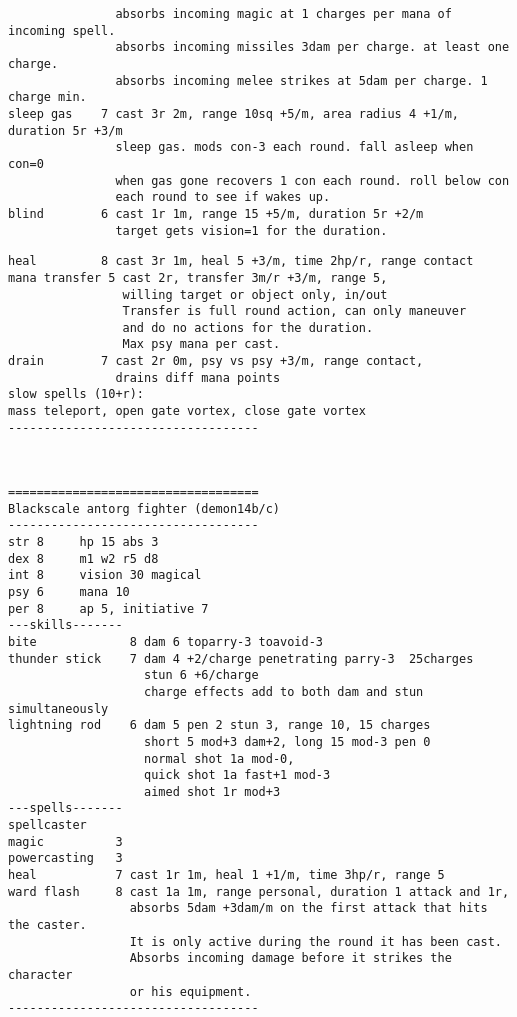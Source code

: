 \begin{samepage}
\begin{verbatim}
               absorbs incoming magic at 1 charges per mana of incoming spell.
               absorbs incoming missiles 3dam per charge. at least one charge.
               absorbs incoming melee strikes at 5dam per charge. 1 charge min.
sleep gas    7 cast 3r 2m, range 10sq +5/m, area radius 4 +1/m, duration 5r +3/m
               sleep gas. mods con-3 each round. fall asleep when con=0
               when gas gone recovers 1 con each round. roll below con
               each round to see if wakes up.
blind        6 cast 1r 1m, range 15 +5/m, duration 5r +2/m
               target gets vision=1 for the duration.
\end{verbatim} \end{samepage} \goodbreak \begin{samepage} \begin{verbatim}
heal         8 cast 3r 1m, heal 5 +3/m, time 2hp/r, range contact
mana transfer 5 cast 2r, transfer 3m/r +3/m, range 5,
                willing target or object only, in/out
                Transfer is full round action, can only maneuver
                and do no actions for the duration.
                Max psy mana per cast.
drain        7 cast 2r 0m, psy vs psy +3/m, range contact,
               drains diff mana points
slow spells (10+r):
mass teleport, open gate vortex, close gate vortex
-----------------------------------
\end{verbatim} \normalsize \end{samepage}

\

\goodbreak \begin{samepage} \small \begin{verbatim}
===================================
Blackscale antorg fighter (demon14b/c)
-----------------------------------
str 8     hp 15 abs 3
dex 8     m1 w2 r5 d8
int 8     vision 30 magical
psy 6     mana 10
per 8     ap 5, initiative 7
---skills-------
bite             8 dam 6 toparry-3 toavoid-3
thunder stick    7 dam 4 +2/charge penetrating parry-3  25charges
                   stun 6 +6/charge
                   charge effects add to both dam and stun simultaneously
lightning rod    6 dam 5 pen 2 stun 3, range 10, 15 charges
                   short 5 mod+3 dam+2, long 15 mod-3 pen 0
                   normal shot 1a mod-0,
                   quick shot 1a fast+1 mod-3
                   aimed shot 1r mod+3
---spells-------
spellcaster
magic          3
powercasting   3
heal           7 cast 1r 1m, heal 1 +1/m, time 3hp/r, range 5
ward flash     8 cast 1a 1m, range personal, duration 1 attack and 1r,
                 absorbs 5dam +3dam/m on the first attack that hits the caster.
                 It is only active during the round it has been cast.
                 Absorbs incoming damage before it strikes the character
                 or his equipment.
-----------------------------------
\end{verbatim} \normalsize \end{samepage}


